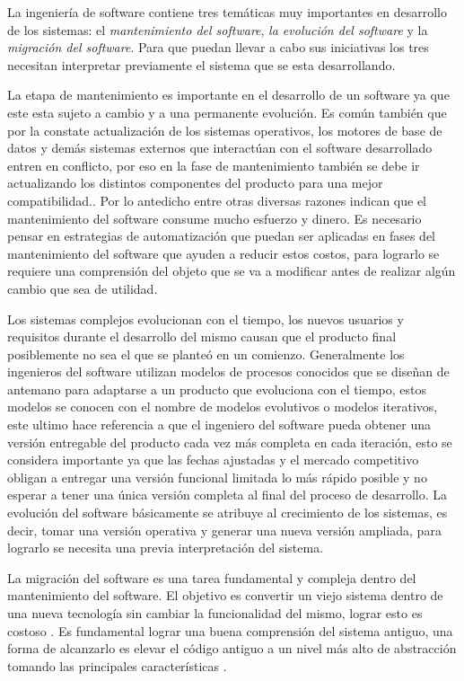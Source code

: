 \documentclass[12pt]{report}
\begin{document}
La ingeniería de software contiene tres temáticas muy importantes en desarrollo de los sistemas: el \textit{mantenimiento del software}, \textit{la evolución del software} y la \textit{migración del software}. Para que puedan llevar a cabo sus iniciativas los tres necesitan interpretar previamente el sistema que se esta desarrollando.

La etapa de mantenimiento es importante en el desarrollo de un software ya que este esta sujeto a cambio y a una permanente evolución\cite{PFT02}.
Es común también que por la constate actualización de los sistemas operativos, los motores de base de datos y demás sistemas externos que interactúan con el software desarrollado entren en conflicto, por eso en la fase de mantenimiento también se debe ir actualizando los distintos componentes del producto para una mejor compatibilidad.\cite{RSPMGH02}. Por lo antedicho entre otras diversas razones indican que el mantenimiento del software consume mucho esfuerzo y dinero. Es necesario pensar en estrategias de automatización que puedan ser aplicadas en fases del mantenimiento del software que ayuden a reducir estos costos, para lograrlo se requiere una comprensión del objeto que se va a modificar antes de realizar algún cambio que sea de utilidad.


Los sistemas complejos evolucionan con el tiempo, los nuevos usuarios y requisitos durante el desarrollo del mismo causan que el producto final posiblemente no sea el que se planteó en un comienzo. 
Generalmente los ingenieros del software utilizan modelos de procesos conocidos que se diseñan de antemano para adaptarse a un producto que evoluciona con el tiempo, estos modelos se conocen con el nombre de modelos evolutivos o modelos iterativos, este ultimo hace referencia a que el ingeniero del software pueda obtener una versión entregable del producto cada vez más completa en cada iteración, esto se considera importante ya que las fechas ajustadas y el mercado competitivo obligan a entregar una versión funcional limitada lo más rápido posible y no esperar a tener una única versión completa al final del proceso de desarrollo\cite{RSPMGH02}.
La evolución del software básicamente se atribuye al crecimiento de los sistemas, es decir, tomar una versión operativa y generar una nueva versión ampliada, para lograrlo se necesita una previa interpretación del sistema.


La migración del software es una tarea fundamental y compleja dentro del mantenimiento del software. El objetivo es convertir un viejo sistema dentro de una nueva tecnología sin cambiar la funcionalidad del mismo, lograr esto es costoso \cite{WHAFVR11}. Es fundamental lograr una buena comprensión del sistema antiguo, una forma de alcanzarlo es elevar el código antiguo a un nivel más alto de abstracción tomando las principales características \cite{MMFAF07}.
\end{document}

